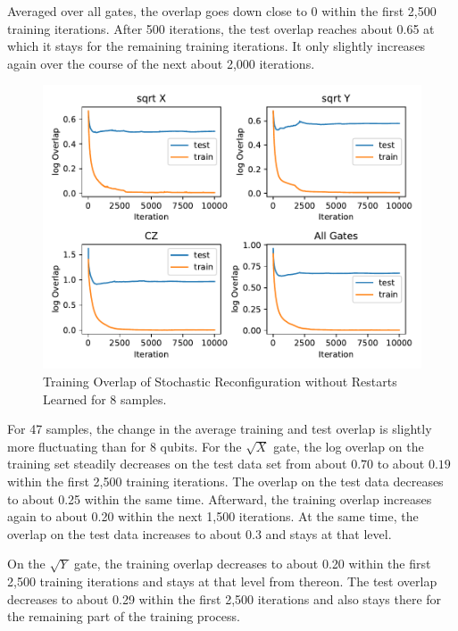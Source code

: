 Averaged over all gates, the overlap goes down close to 0 within the first 2,500 training iterations. 
After 500 iterations, the test 
overlap reaches about 0.65 at which it stays for the remaining training iterations. It only 
slightly increases again over the course of the next about 2,000 iterations.


\begin{figure}[H]
  \centering
  \includegraphics[width=\textwidth]{figures/results/SR-no-restarts-learned/avgOverlap_8.pdf}
  \caption[Training Overlap of Stochastic Reconfiguration without Restarts Learned]{Training 
  Overlap of Stochastic Reconfiguration without Restarts Learned for 8 samples.}
  \label{fig:sr_no_restarts_overlap_8}
\end{figure}

For 47 samples, the change in the average training and test overlap is slightly more fluctuating than for 8 qubits. For the 
$\sqrt{X}$ gate, the log overlap on the training set steadily decreases on the test data set from 
about $0.70$ to about $0.19$ within the first 2,500 training iterations. The overlap on the test data 
decreases to about 0.25 within the same time. Afterward, the training overlap increases again to about 
0.20 within the next 1,500 iterations. At the same time, the overlap on the test data increases to about 
0.3 and stays at that level.

On the $\sqrt{Y}$ gate, the training overlap decreases to about 0.20 within the first 2,500 training iterations 
and stays at that level from thereon. The test overlap decreases to about 0.29 within the first 2,500 iterations 
and also stays there for the remaining part of the training process.

